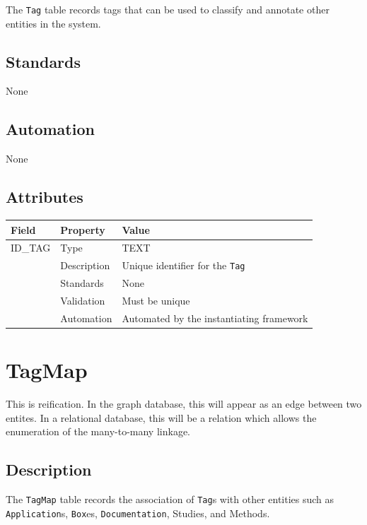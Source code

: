 \documentclass[
]{article}
\newcounter{none} %
\begin{document}
The \texttt{Tag} table records tags that can be used to classify and
annotate other entities in the system.

\subsection{Standards}\label{standards-35}

None

\subsection{Automation}\label{automation-35}

None

\subsection{Attributes}\label{attributes-30}

{\def\LTcaptype{none} %
\begin{longtable}[]{@{}lll@{}}
\toprule\noalign{}
Field & Property & Value \\
\midrule\noalign{}
\endhead
\bottomrule\noalign{}
\endlastfoot
ID\_TAG & Type & TEXT \\
& Description & Unique identifier for the \texttt{Tag} \\
& Standards & None \\
& Validation & Must be unique \\
& Automation & Automated by the instantiating framework \\
\end{longtable}
}

\section{TagMap}\label{tagmap}

This is reification. In the graph database, this will appear as an edge
between two entites. In a relational database, this will be a relation
which allows the enumeration of the many-to-many linkage.

\subsection{Description}\label{description-34}

The \texttt{TagMap} table records the association of \texttt{Tag}s with
other entities such as \texttt{Application}s, \texttt{Box}es,
\texttt{Documentation}, Studies, and Methods.
\end{document}

